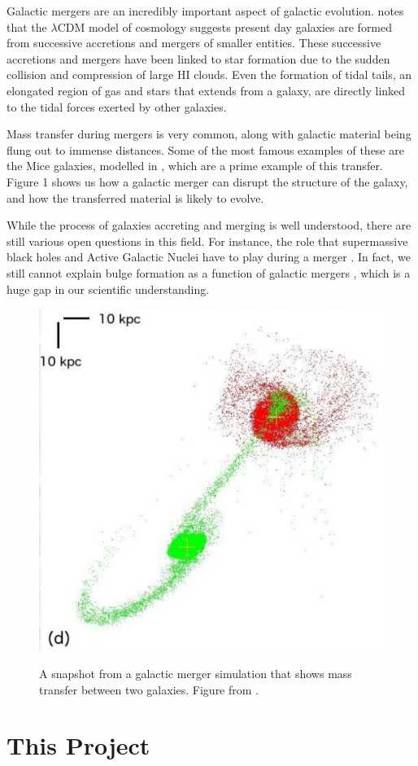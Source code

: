 \documentclass[linenumbers, ]{aastex631}
\begin{document}
Galactic mergers are an incredibly important aspect of galactic evolution. \citep{1978MNRAS.183..341W} notes that the $\lambda\text{CDM}$ model of cosmology suggests present day galaxies are formed from successive accretions and mergers of smaller entities. These successive accretions and mergers have been linked to star formation \citep{Barnes_2004} due to the sudden collision and compression of large HI clouds. Even the formation of tidal tails, an elongated region of gas and stars that extends from a galaxy, are directly linked to the tidal forces exerted by other galaxies.

Mass transfer during mergers is very common, along with galactic material being flung out to immense distances. Some of the most famous examples of these are the Mice galaxies, modelled in \citep{Privon_2013}, which are a prime example of this transfer. Figure 1 shows us how a galactic merger can disrupt the structure of the galaxy, and how the transferred material is likely to evolve. 

While the process of galaxies accreting and merging is well understood, there are still various open questions in this field. For instance, the role that supermassive black holes and Active Galactic Nuclei have to play during a merger \citep{Silverman_2011}. In fact, we still cannot explain bulge formation as a function of galactic mergers \citep{Brooks2016}, which is a huge gap in our scientific understanding.

\begin{figure}
    \centering
    \includegraphics[width = 0.5\linewidth]{page08_1.jpg}
    \label{fig:Privonimage}
    \caption{A snapshot from a galactic merger simulation that shows mass transfer between two galaxies. Figure from \citep{Privon_2013}.}
\end{figure}


\section{This Project}
\end{document}
